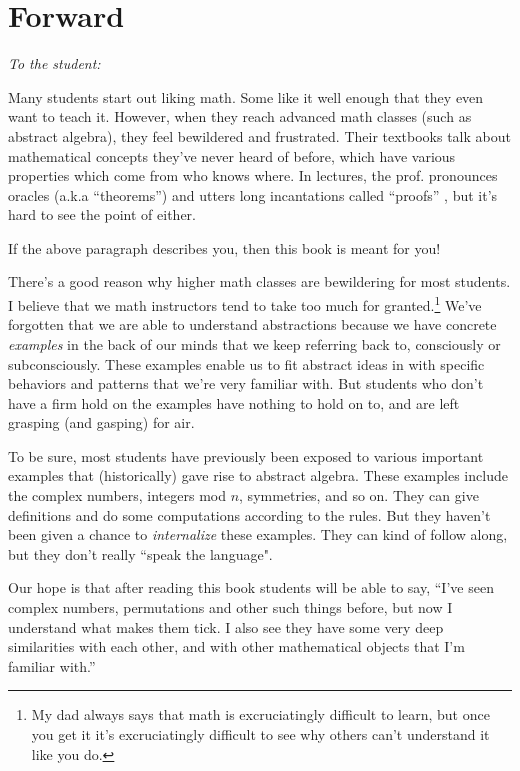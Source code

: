 \chapter*{Forward}

\emph{To the student:}
\medskip

Many students start out liking math. Some like it well enough that they even want to teach it. However, when they reach advanced math classes (such as abstract algebra), they feel bewildered and frustrated. Their textbooks talk about mathematical concepts they've never heard of before, which have various properties which come from who knows where. In lectures, the prof. pronounces oracles (a.k.a ``theorems'') and utters long incantations called ``proofs'' , but it's hard to see the point of either. 
\medskip

If the above paragraph describes you, then this book is meant for you!
\medskip

There's a good reason why higher math classes are bewildering for most students. I believe that we math instructors tend to take too much for granted.\footnote{My dad always says that math is excruciatingly difficult to learn, but once you get  it it's excruciatingly difficult to see why others can't understand it like you do.} We've forgotten that we are able to understand abstractions because we have concrete \emph{examples} in the back of our minds that we keep referring back to, consciously or subconsciously. These examples enable us to fit abstract ideas in with specific behaviors and patterns that we're very familiar with. But students who don't have a firm hold on the examples have nothing to hold on to, and are left grasping (and gasping) for air. 

To be sure, most students have previously been exposed to various important examples that (historically) gave rise to abstract algebra. These examples include the complex numbers, integers mod $n$, symmetries, and so on. They can give definitions and do some computations according to the rules. But they haven't been given a chance to \emph{internalize} these examples.  They can kind of follow along, but they don't really ``speak the language".

Our hope is that after reading this book students will be able to say, ``I've seen complex numbers, permutations and other such things before, but now I understand what makes them tick. I also see they have some very deep similarities with each other, and with other mathematical objects that I'm familiar with.'' 

